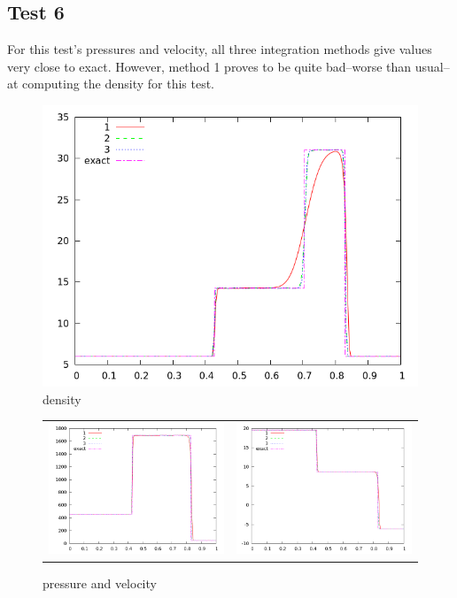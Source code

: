 \documentclass[10pt,preprint]{aastex}
\begin{document}
\subsection{Test 6}
For this test's pressures and velocity, all three integration methods give values very close to exact. However, method 1 proves to be quite bad--worse than usual--at computing the density for this test. 

\begin{figure}[h]
  \begin{center}
     \includegraphics[width=.78\textwidth]{den_T6.png}	
  \end{center}
  \caption{density}
\end{figure}

\begin{figure}
  \begin{center}
	\begin{tabular}{cc}
      \includegraphics[width=.425\textwidth]{prs_T6.png} &
	  \includegraphics[width=.425\textwidth]{vel_T6.png}
	\end{tabular}
  \end{center}
  \caption{pressure and velocity}
\end{figure}
\end{document}
